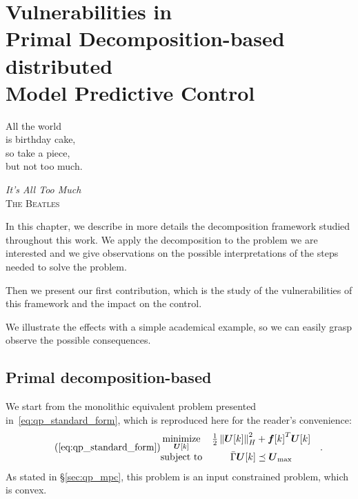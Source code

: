 \documentclass[../main.tex]{subfiles}
\begin{document}
\chapter[Vulnerabilities in Primal Decomposition-based dMPC]{Vulnerabilities in \\Primal Decomposition-based \\distributed \\Model Predictive Control}\label{sec:primal_decomposition}
\epigraph{\centering All the world\\ is birthday cake,\\ so take a piece, \\but not too much.}
{\textit{It's All Too Much}\\\textsc{The Beatles}}

In this chapter, we describe in more details the decomposition framework studied throughout this work.
We apply the decomposition to the \mpc{} problem we are interested and we give observations on the possible interpretations of the steps needed to solve the problem.

Then we present our first contribution, which is the study of the vulnerabilities of this framework and the impact on the \mpc{} control.

We illustrate the effects with a simple academical example, so we can easily grasp observe the possible consequences.

\minitoc

\newpage
\section{Primal decomposition-based \dmpc{}}\label{sec:decomposition_PD}

We start from the monolithic \mpc{} equivalent problem presented in~\eqref{eq:qp_standard_form}, which is reproduced here for the reader's convenience:
\begin{equation}
  \label{eq:qp_standard_form_reprise}
  \tag{\ref*{eq:qp_standard_form}}
  \begin{aligned}
    \begin{matrix}
      \minimize\limits_{\vec{U}[k]} &
      \frac{1}{2}\norm{\vec{U}[k]}^{2}_{H} + {\vec{f}[k]}^{T}\vec{U}[k] &\\
      \mathrm{subject~ to} &
\bar{\Gamma}\vec{U}[k]\preceq {\vec{U}}_{\text{max}}
    \end{matrix}
  \end{aligned}.
\end{equation}
As stated in \S\ref{sec:qp_mpc}, this problem is an input constrained \qp{} problem, which is convex.
\end{document}
